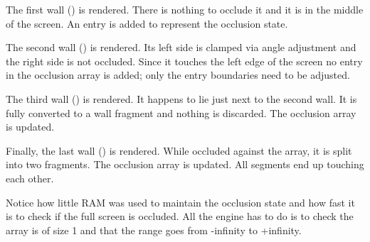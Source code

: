The first wall () is rendered. There is nothing to occlude it and it is in the middle of the screen. An entry is added to represent the occlusion state.
\par
\begin{minipage}{0.54\textwidth}
\vspace*{2.5mm}
\end{minipage}
\begin{minipage}{0.46\textwidth}
\centering
{}
\end{minipage}
\par



The second wall () is rendered. Its left side is clamped via angle adjustment and the right side is not occluded. Since it touches the left edge of the screen no entry in the occlusion array is added; only the entry boundaries need to be adjusted.
\par
\begin{minipage}{0.54\textwidth}
\vspace*{2.5mm}
\end{minipage}
\begin{minipage}{0.45\textwidth}
\centering
{}
\end{minipage}
\par





The third wall () is rendered. It happens to lie just next to the second wall. It is fully converted to a wall fragment and nothing is discarded. The occlusion array is updated.
\begin{minipage}{0.54\textwidth}
\vspace*{2.5mm}
\end{minipage}
\begin{minipage}{0.46\textwidth}
\centering
{}
\end{minipage}
\par


Finally, the last wall () is rendered. While occluded against the array, it is split into two fragments. The occlusion array is updated. All segments end up touching each other. 
\begin{minipage}{0.54\textwidth}
\vspace*{2.5mm}
\end{minipage}
\begin{minipage}{0.46\textwidth}
\centering
{}
\end{minipage}
\par
\vspace{5pt}
Notice how little RAM was used to maintain the occlusion state and how fast it is to check if the full screen is occluded. All the engine has to do is to check the array is of size 1 and that the range goes from -infinity to +infinity.


